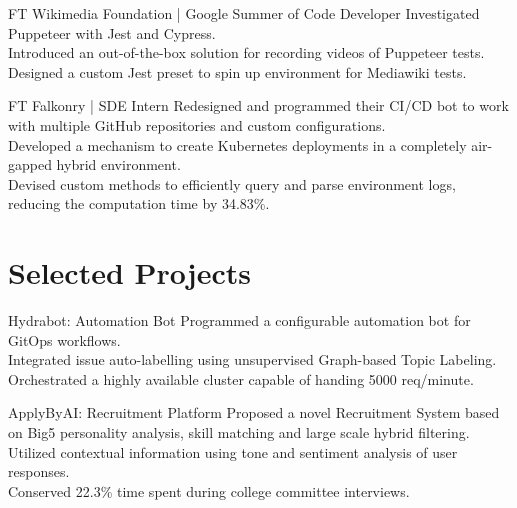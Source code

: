 \documentclass[10pt]{article} %
\begin{document}
\begin{paracol}{2}
{FT} %
{}
{Wikimedia Foundation | \small{Google Summer of Code Developer}} %
{
\textbullet{} Investigated Puppeteer with Jest and Cypress. \\
\textbullet{} Introduced an out-of-the-box solution for recording videos of Puppeteer tests. \\
\textbullet{} Designed a custom Jest preset to spin up environment for Mediawiki tests.
}  %


{FT} %
{} %
{Falkonry | \small{SDE Intern}} %
{
\textbullet{} Redesigned and programmed their CI/CD bot to work with multiple GitHub repositories and custom configurations. \\
\textbullet{} Developed a mechanism to create Kubernetes deployments in a completely air-gapped hybrid environment. \\
\textbullet{} Devised custom methods to efficiently query and parse environment logs, reducing the computation time by 34.83\%.
} %



\section{Selected Projects}

{}
{}
{Hydrabot: Automation Bot} %
{
\textbullet{} Programmed a configurable  automation bot for GitOps workflows. \\
\textbullet{} Integrated issue auto-labelling using unsupervised Graph-based Topic Labeling. \\
\textbullet{} Orchestrated a highly available cluster capable of handing 5000 req/minute.
} %

{}
{}
{ApplyByAI: Recruitment Platform} %
{
\textbullet{} Proposed a novel Recruitment System based on Big5 personality analysis, skill matching and large scale hybrid filtering. \\
\textbullet{} Utilized contextual information using tone and sentiment analysis of user responses. \\
\textbullet{} Conserved 22.3\% time spent during college committee interviews.
} %


\end{paracol}
\end{document}
